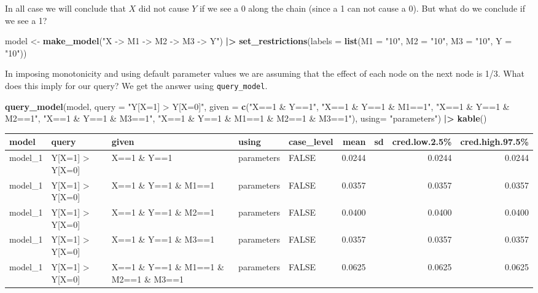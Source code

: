 \documentclass[
  12pt,
]{book}
\newenvironment{Shaded}{\begin{snugshade}}{\end{snugshade}}
\newcommand{\AttributeTok}[1]{\textcolor[rgb]{0.13,0.29,0.53}{#1}}
\newcommand{\FunctionTok}[1]{\textcolor[rgb]{0.13,0.29,0.53}{\textbf{#1}}}
\newcommand{\NormalTok}[1]{#1}
\newcommand{\OtherTok}[1]{\textcolor[rgb]{0.56,0.35,0.01}{#1}}
\newcommand{\SpecialCharTok}[1]{\textcolor[rgb]{0.81,0.36,0.00}{\textbf{#1}}}
\newcommand{\StringTok}[1]{\textcolor[rgb]{0.31,0.60,0.02}{#1}}
\begin{document}
In all case we will conclude that \(X\) did not cause \(Y\) if we see a 0 along the chain (since a 1 can not cause a 0). But what do we conclude if we see a 1?

\begin{Shaded}
\begin{Highlighting}[]
\NormalTok{model }\OtherTok{\textless{}{-}} \FunctionTok{make\_model}\NormalTok{(}\StringTok{"X {-}\textgreater{} M1 {-}\textgreater{} M2 {-}\textgreater{} M3 {-}\textgreater{} Y"}\NormalTok{) }\SpecialCharTok{|\textgreater{}}
  \FunctionTok{set\_restrictions}\NormalTok{(}\AttributeTok{labels =} \FunctionTok{list}\NormalTok{(}\AttributeTok{M1 =} \StringTok{"10"}\NormalTok{, }\AttributeTok{M2 =} \StringTok{"10"}\NormalTok{, }\AttributeTok{M3 =} \StringTok{"10"}\NormalTok{, }\AttributeTok{Y =} \StringTok{"10"}\NormalTok{))}
\end{Highlighting}
\end{Shaded}

In imposing monotonicity and using default parameter values we are assuming that the effect of each node on the next node is 1/3. What does this imply for our query? We get the answer using \texttt{query\_model}.

\begin{Shaded}
\begin{Highlighting}[]
\FunctionTok{query\_model}\NormalTok{(model, }
            \AttributeTok{query =} \StringTok{"Y[X=1] \textgreater{} Y[X=0]"}\NormalTok{, }
            \AttributeTok{given =} \FunctionTok{c}\NormalTok{(}\StringTok{"X==1 \& Y==1"}\NormalTok{, }\StringTok{"X==1 \& Y==1 \& M1==1"}\NormalTok{, }\StringTok{"X==1 \& Y==1 \& M2==1"}\NormalTok{, }
                      \StringTok{"X==1 \& Y==1 \& M3==1"}\NormalTok{, }\StringTok{"X==1 \& Y==1 \& M1==1 \& M2==1 \& M3==1"}\NormalTok{),}
            \AttributeTok{using=} \StringTok{"parameters"}\NormalTok{) }\SpecialCharTok{|\textgreater{}} \FunctionTok{kable}\NormalTok{()}
\end{Highlighting}
\end{Shaded}

\begin{tabular}{l|l|l|l|l|r|r|r|r}
\hline
model & query & given & using & case\_level & mean & sd & cred.low.2.5\% & cred.high.97.5\%\\
\hline
model\_1 & Y[X=1] > Y[X=0] & X==1 \& Y==1 & parameters & FALSE & 0.0244 &  & 0.0244 & 0.0244\\
\hline
model\_1 & Y[X=1] > Y[X=0] & X==1 \& Y==1 \& M1==1 & parameters & FALSE & 0.0357 &  & 0.0357 & 0.0357\\
\hline
model\_1 & Y[X=1] > Y[X=0] & X==1 \& Y==1 \& M2==1 & parameters & FALSE & 0.0400 &  & 0.0400 & 0.0400\\
\hline
model\_1 & Y[X=1] > Y[X=0] & X==1 \& Y==1 \& M3==1 & parameters & FALSE & 0.0357 &  & 0.0357 & 0.0357\\
\hline
model\_1 & Y[X=1] > Y[X=0] & X==1 \& Y==1 \& M1==1 \& M2==1 \& M3==1 & parameters & FALSE & 0.0625 &  & 0.0625 & 0.0625\\
\hline
\end{tabular}
\end{document}
